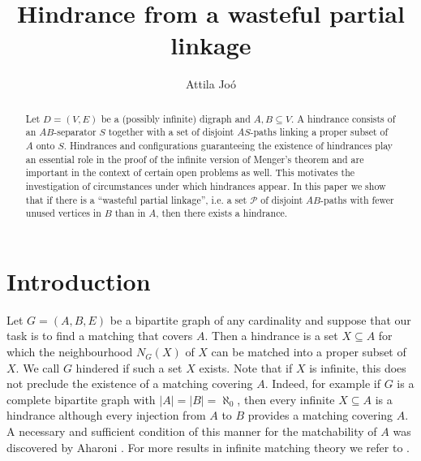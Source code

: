 \documentclass[12pt,a4paper]{amsart}
\title{Hindrance from a wasteful partial linkage}
\author{Attila Jo\'{o}}
\theoremstyle{plain}
\theoremstyle{definition}
\begin{document}
\begin{abstract}
Let $ D=(V,E) $ be a (possibly infinite) digraph and $ A,B\subseteq V $. A hindrance consists of an $ AB $-separator $ S $ 
together with a set of disjoint $ AS $-paths linking a proper subset of $ A $ onto $ S $. Hindrances and configurations 
guaranteeing the existence of hindrances play an essential role in the proof of the infinite version of Menger's theorem and are 
important in the context of certain open problems as well. This motivates the investigation of circumstances under which 
hindrances appear. In this paper we show that if there is a ``wasteful partial linkage'', i.e. a set $ \mathcal{P} $ of disjoint $ 
AB $-paths with fewer unused vertices in $ B $ than in $ A $, then there exists a hindrance.
\end{abstract}
\maketitle

\section{Introduction}
Let $ G=(A,B, E) $ be a bipartite graph of any cardinality and suppose that our task is to find a matching that covers $ A $. Then a hindrance is 
a set $ X\subseteq A  $ for which the neighbourhood $ N_G(X) $ of $ X $ can be matched into a proper subset of $ X $. We 
call $ G $ hindered if such a set $ X $ exists. Note 
that if $ X $ is infinite, this does not preclude the existence of a matching covering $ A $. Indeed, for example if $ 
G $ is a 
complete bipartite graph with $ \left|A\right|=\left|B\right|=\aleph_0 $, then every infinite $ X\subseteq A $ is a hindrance 
although every injection from $ A $ to $ B $ provides a matching covering $ A $. A necessary and sufficient condition of this manner for the 
matchability of $ A $ 
was discovered by Aharoni \cite[Theorem 1.8]{aharoni2009menger}. For more results in infinite matching theory we refer to 
\cite{aharoni1991infinite}.
\end{document}
